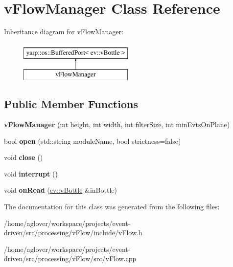 \hypertarget{classvFlowManager}{}\section{v\+Flow\+Manager Class Reference}
\label{classvFlowManager}
Inheritance diagram for v\+Flow\+Manager\+:\begin{figure}[H]
\begin{center}
\leavevmode
\includegraphics[height=2.000000cm]{classvFlowManager}
\end{center}
\end{figure}
\subsection*{Public Member Functions}
\begin{DoxyCompactItemize}
\item 
{\bfseries v\+Flow\+Manager} (int height, int width, int filter\+Size, int min\+Evts\+On\+Plane)\hypertarget{classvFlowManager_a9d28c98ce6f6c0591a89f5055153e295}{}\label{classvFlowManager_a9d28c98ce6f6c0591a89f5055153e295}

\item 
bool {\bfseries open} (std\+::string module\+Name, bool strictness=false)\hypertarget{classvFlowManager_a2c299db37662565d5b0c59679b790a4b}{}\label{classvFlowManager_a2c299db37662565d5b0c59679b790a4b}

\item 
void {\bfseries close} ()\hypertarget{classvFlowManager_abcf434ef8391ec6741c0754bc4a88ab8}{}\label{classvFlowManager_abcf434ef8391ec6741c0754bc4a88ab8}

\item 
void {\bfseries interrupt} ()\hypertarget{classvFlowManager_a10d85ce69f60a672adba81aff4a046d8}{}\label{classvFlowManager_a10d85ce69f60a672adba81aff4a046d8}

\item 
void {\bfseries on\+Read} (\hyperlink{classev_1_1vBottle}{ev\+::v\+Bottle} \&in\+Bottle)\hypertarget{classvFlowManager_a9749ff591f71a96735692ce1520c9e30}{}\label{classvFlowManager_a9749ff591f71a96735692ce1520c9e30}

\end{DoxyCompactItemize}


The documentation for this class was generated from the following files\+:\begin{DoxyCompactItemize}
\item 
/home/aglover/workspace/projects/event-\/driven/src/processing/v\+Flow/include/v\+Flow.\+h\item 
/home/aglover/workspace/projects/event-\/driven/src/processing/v\+Flow/src/v\+Flow.\+cpp\end{DoxyCompactItemize}
